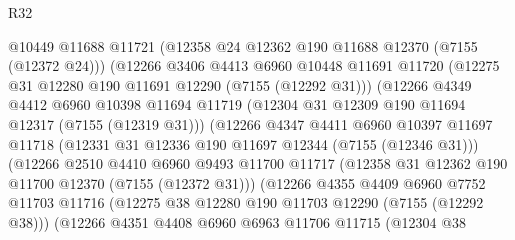\begin{lexlean}{R32}
\begin{coremodule}
                              @10449
                              @11688
                              @11721
                              (@12358 @24 @12362 @190 @11688 @12370 (@7155 (@12372 @24)))
                              (@12266
                                @3406
                                @4413
                                @6960
                                @10448
                                @11691
                                @11720
                                (@12275 @31 @12280 @190 @11691 @12290 (@7155 (@12292 @31)))
                                (@12266
                                  @4349
                                  @4412
                                  @6960
                                  @10398
                                  @11694
                                  @11719
                                  (@12304 @31 @12309 @190 @11694 @12317 (@7155 (@12319 @31)))
                                  (@12266
                                    @4347
                                    @4411
                                    @6960
                                    @10397
                                    @11697
                                    @11718
                                    (@12331 @31 @12336 @190 @11697 @12344 (@7155 (@12346 @31)))
                                    (@12266
                                      @2510
                                      @4410
                                      @6960
                                      @9493
                                      @11700
                                      @11717
                                      (@12358 @31 @12362 @190 @11700 @12370 (@7155 (@12372 @31)))
                                      (@12266
                                        @4355
                                        @4409
                                        @6960
                                        @7752
                                        @11703
                                        @11716
                                        (@12275 @38 @12280 @190 @11703 @12290 (@7155 (@12292 @38)))
                                        (@12266
                                          @4351
                                          @4408
                                          @6960
                                          @6963
                                          @11706
                                          @11715
                                          (@12304
                                            @38

\end{coremodule}
\end{lexlean}
